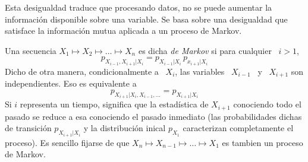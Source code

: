 

Esta  desigualdad  traduce  que  procesando  datos,  no  se  puede  aumentar  la
informaci\'on disponible sobre  una variable. Se basa sobre  una desigualdad que
satisface la informaci\'on mutua aplicada a un proceso de Markov.

\begin{definicion}
  Una secuencia  $X_1 \mapsto X_2 \mapsto  \ldots \mapsto X_n$ es  dicha {\it de
    Markov}   si   para  cualquier \   $i   >   1$,
  \[
  p_{X_{i-1},X_{i+1}|X_i} = p_{X_{i-1}|X_i} \, p_{x_{i+1}|X_i}
  \]
  Dicho de otra manera, condicionalmente a  \ $X_i$, las variables \ $X_{i-1}$ \
  y \ $X_{i+1}$ son independientes.  Eso es equivalente a
  \[
  p_{X_{i+1}|X_i,X_{i-1},\ldots} = p_{X_{i+1}|X_i}
  \]
  Si  $i$ representa  un tiempo,  significa  que la  estad\'istica de  $X_{i+1}$
  conociendo todo el pasado se reduce  a esa conociendo el pasado inmediato (las
  probabilidades  dichas de transici\'on  $p_{X_{i+1}|X_i}$ y  la distribuci\'on
  inical $p_{X_1}$ caracterizan completamente  el proceso).  Es sencillo fijarse
  de que $X_n \mapsto X_{n-1} \mapsto  \ldots \mapsto X_1$ es tambien un proceso
  de Markov.
\end{definicion}


